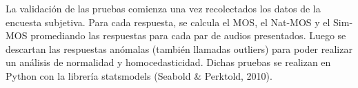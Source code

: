 La validación de las pruebas comienza una vez recolectados los datos de la encuesta subjetiva. Para cada respuesta, se calcula el MOS, el Nat-MOS y el Sim-MOS promediando las respuestas para cada par de audios presentados. Luego se descartan las respuestas anómalas (también llamadas outliers) para poder realizar un análisis de normalidad y homocedasticidad. Dichas pruebas se realizan en Python con la librería statsmodels (Seabold \& Perktold, 2010).